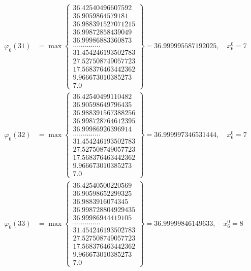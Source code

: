 \documentclass{article}
\begin{document}
\begin{align*}
  
  
  
\varphi_{6}(31) &= \max \left\{ \begin{array}{c}
36.42540496607592 \\
 36.9059864579181 \\
 36.988391527071215 \\
 36.99872858439049 \\
 36.99986883360873 \\
 .............. \\
 31.454246193502783 \\
 27.527508749057723 \\
 17.568376463442362 \\
 9.966673010385273 \\
 7.0
\end{array} \right\} = 36.999995587192025, \quad x_{6}^0 = 7\\
  
  
  
  
\varphi_{6}(32) &= \max \left\{ \begin{array}{c}
36.42540499110482 \\
 36.90598649796435 \\
 36.988391567388256 \\
 36.998728764612395 \\
 36.99986926396914 \\
 .............. \\
 31.454246193502783 \\
 27.527508749057723 \\
 17.568376463442362 \\
 9.966673010385273 \\
 7.0
\end{array} \right\} = 36.999997346531444, \quad x_{6}^0 = 7\\
  
  
  
  
\varphi_{6}(33) &= \max \left\{ \begin{array}{c}
36.42540500220569 \\
 36.90598652299325 \\
 36.9883916074345 \\
 36.998728804929435 \\
 36.99986944419105 \\
 .............. \\
 31.454246193502783 \\
 27.527508749057723 \\
 17.568376463442362 \\
 9.966673010385273 \\
 7.0
\end{array} \right\} = 36.99999846149633, \quad x_{6}^0 = 8\\
  

\end{align*}
\end{document}
